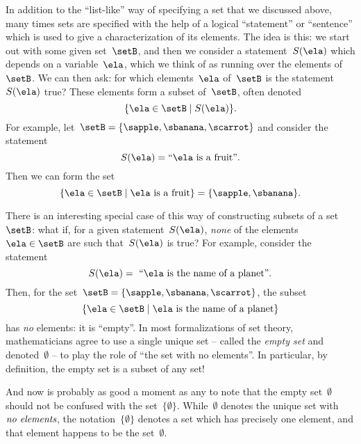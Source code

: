 In addition to the ``list-like'' way of specifying a set that we discussed above, many times sets are specified with the help of a logical ``statement'' or ``sentence'' which is used to give a characterization of its elements.
The idea is this: we start out with some given set~$\setB$, and then we consider a statement~$S(\ela)$ which depends on a variable~$\ela$, which we think of as running over the elements of~$\setB$.
We can then ask: for which elements~$\ela$ of~$\setB$ is the statement~$S(\ela)$ true?
These elements form a subset of~$\setB$, often denoted
%
\begin{equation}
    \label{eq:axiom-specialization}
    \{ \ela \in \setB \mid S(\ela) \}.
\end{equation}
%
For example, let~$\setB = \{ \sapple, \sbanana, \scarrot \}$ and consider the statement
%
\begin{equation*}
    S(\ela) = \text{``} \ela \text{ is a fruit''}.
\end{equation*}
%
Then we can form the set
%
\begin{equation*}
    \{ \ela \in \setB \mid \ela \text{ is a fruit} \} = \{ \sapple, \sbanana \}.
\end{equation*}

There is an interesting special case of this way of constructing subsets of a set~$\setB$:
what if, for a given statement~$S(\ela)$, \emph{none} of the elements~$\ela \in \setB$ are such that~$S(\ela)$ is true?
For example, consider the statement
%
\begin{equation*}
    S(\ela) =\text{ ``} \ela \text{ is the name of a planet''}.
\end{equation*}
%
Then, for the set~$\setB = \{ \sapple, \sbanana, \scarrot \}$, the subset
\begin{equation*}
    \{ \ela \in \setB \mid \ela \text{ is the name of a planet} \}
\end{equation*}
has \emph{no} elements: it is ``empty''.
In most formalizations of set theory, mathematicians agree to use a single unique set -- called the \emph{empty set} and denoted~$\emptyset$ -- to play the role of ``the set with no elements''.
In particular, by definition, the empty set is a subset of any set!

And now is probably as good a moment as any to note that the empty set~$\emptyset$ should not be confused with the set~$\{ \emptyset \}$.
While~$\emptyset$ denotes the unique set with~$\emph{no elements}$, the notation~$\{ \emptyset \}$ denotes a set which has precisely one element, and that element happens to be the set~$\emptyset$.




